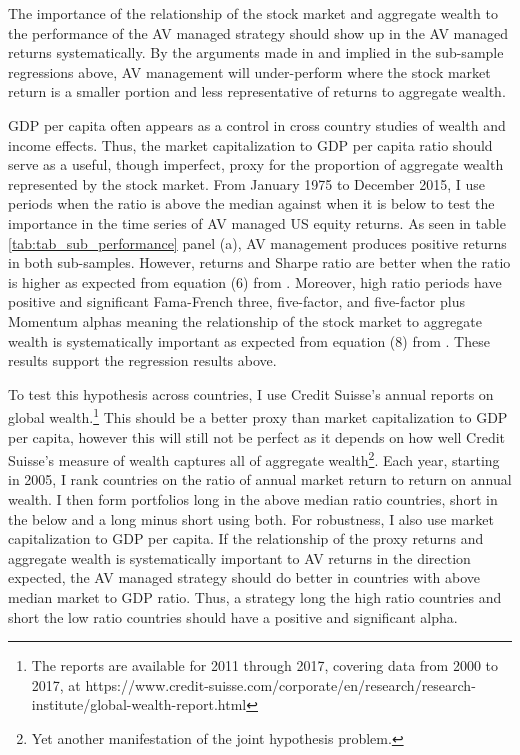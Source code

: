 The importance of the relationship of the stock market and aggregate wealth to the performance of the AV managed strategy should show up in the AV managed returns systematically. By the arguments made in \citet{pollet_average_2010} and implied in the sub-sample regressions above, AV management will under-perform where the stock market return is a smaller portion and less representative of returns to aggregate wealth. 

GDP per capita  often appears as a control in cross country studies of wealth and income effects. \citep{barro_cross-country_1989,levine_what_1993,baird_aggregate_2010} Thus, the market capitalization to GDP per capita ratio should serve as a useful, though imperfect, proxy for the proportion of aggregate wealth represented by the stock market. From January 1975 to December 2015, I use periods when the ratio is above the median against when it is below to test the importance in the time series of AV managed US equity returns. As seen in table \ref{tab:tab_sub_performance} panel (a), AV management produces positive returns in both sub-samples. However, returns and Sharpe ratio are better when the ratio is higher as expected from equation (6) from \citet{pollet_average_2010}. Moreover, high ratio periods have positive and significant Fama-French three, five-factor, and five-factor plus Momentum alphas meaning the relationship of the stock market to aggregate wealth is systematically important as expected from equation (8) from \citet{pollet_average_2010}. These results support the regression results above.

To test this hypothesis across countries, I use Credit Suisse's annual reports on global wealth.\footnote{The reports are available for 2011 through 2017, covering data from 2000 to 2017, at https://www.credit-suisse.com/corporate/en/research/research-institute/global-wealth-report.html} This should be a better proxy than market capitalization to GDP per capita, however this will still not be perfect as it depends on how well Credit Suisse's measure of wealth captures all of aggregate wealth\footnote{Yet another manifestation of the joint hypothesis problem.}. Each year, starting in 2005, I rank countries on the ratio of annual market return to return on annual wealth. I then form portfolios long in the above median ratio countries, short in the below and a long minus short using both. For robustness, I also use market capitalization to GDP per capita. If the relationship of the proxy returns and aggregate wealth is systematically important to AV returns in the direction expected, the AV managed strategy should do better in countries with above median market to GDP ratio. Thus, a strategy long the high ratio countries and short the low ratio countries should have a positive and significant alpha. 

